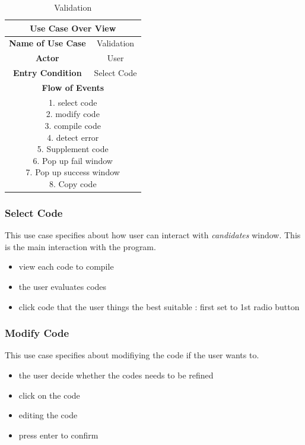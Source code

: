 \documentclass[conference]{IEEEtran}
\begin{document}
\begin{table}[hbt]
\renewcommand{\arraystretch}{1}
\caption{Validation}
\label{table:usecase3}
\centering
\begin{adjustbox}{width=0.3\textwidth}
\small
\begin{tabular}{c|c}
\hline
\multicolumn{2}{c}{\textbf{Use Case Over View}} \\
\hline
\textbf{Name of Use Case} & Validation \\
\hline
\textbf{Actor} & User \\
\hline
\textbf{Entry Condition} & Select Code\\
\hline
\multicolumn{2}{c}{\textbf{Flow of Events}}\\
\hline
\multicolumn{2}{c}{
\parbox[t]{5cm}{
  1. select code \\
  2. modify code \\
  3. compile code \\
  4. detect error \\
  5. Supplement code \\
  6. Pop up fail window \\
  7. Pop up success window \\
  8. Copy code
  }
}\\
\hline

\end{tabular}
\end{adjustbox}
\end{table}



\subsubsection{Select Code}
This use case specifies about how user can interact with \textit{candidates} window. This is the main interaction with the program.
\begin{itemize}
  \item view each code to compile
  \item the user evaluates codes
  \item click code that the user things the best suitable : first set to 1st radio button
\end{itemize}
\textit{}


\subsubsection{Modify Code}
This use case specifies about modifiying the code if the user wants to.
\begin{itemize}
  \item the user decide whether the codes needs to be refined
  \item click on the code
  \item editing the code
  \item press enter to confirm
\end{itemize}
\textit{}
\end{document}
